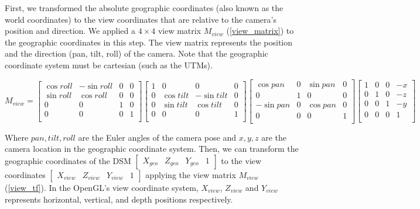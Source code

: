 \documentclass{article}
\begin{document}
First, we transformed the absolute geographic coordinates (also known as the world coordinates) to the view coordinates that are relative to the camera's position and direction. We applied a \(4 \times 4\) view matrix \(M_{view}\) (\ref{view_matrix}) to the geographic coordinates in this step. The view matrix represents the position and the direction (pan, tilt, roll) of the camera. Note that the geographic coordinate system must be cartesian (such as the UTMs).

\label{view_matrix}
\begin{equation}
  M_{view} = 
  \begin{bmatrix}
    \cos roll & -\sin roll & 0 & 0 \\
    \sin roll & \cos roll & 0 & 0 \\
    0 & 0 & 1 & 0 \\
    0 & 0 & 0 & 1 \\
  \end{bmatrix}
  \begin{bmatrix}
    1 & 0 & 0 & 0 \\
    0 & \cos tilt & -\sin tilt & 0 \\
    0 & \sin tilt & \cos tilt & 0 \\
    0 & 0 & 0 & 1 \\
  \end{bmatrix}
  \begin{bmatrix}
    \cos pan & 0 & \sin pan & 0 \\
    0 & 1 & 0 & 0 \\
    -\sin pan & 0 & \cos pan & 0 \\
    0 & 0 & 0 & 1 \\
  \end{bmatrix}
  \begin{bmatrix}
    1 & 0 & 0 & -x \\
    0 & 1 & 0 & -z \\
    0 & 0 & 1 & -y \\
    0& 0 & 0 & 1 \\
  \end{bmatrix}
\end{equation}

Where \(pan, tilt, roll\) are the Euler angles of the camera pose and \(x, y, z\) are the camera location in the geographic coordinate system. Then, we can transform the geographic coordinates of the DSM \(\begin{bmatrix} X_{geo} & Z_{geo} & Y_{geo} & 1 \end{bmatrix}\) to the view coordinates \(\begin{bmatrix} X_{view} & Z_{view} & Y_{view} & 1 \end{bmatrix}\) applying the view matrix \(M_{view}\) (\ref{view_tf}). In the OpenGL's view coordinate system, \(X_{view}\), \(Z_{view}\) and \(Y_{view}\) represents horizontal, vertical, and depth positions respectively.
\end{document}
